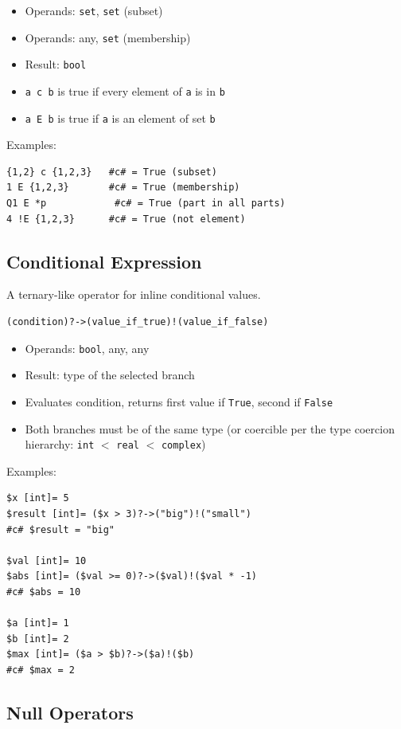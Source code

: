\begin{itemize}
\item Operands: \texttt{set}, \texttt{set} (subset)
\item Operands: any, \texttt{set} (membership)
\item Result: \texttt{bool}
\item \texttt{a c b} is true if every element of \texttt{a} is in \texttt{b}
\item \texttt{a E b} is true if \texttt{a} is an element of set \texttt{b}
\end{itemize}

Examples:
\begin{verbatim}
{1,2} c {1,2,3}   #c# = True (subset)
1 E {1,2,3}       #c# = True (membership)
Q1 E *p            #c# = True (part in all parts)
4 !E {1,2,3}      #c# = True (not element)
\end{verbatim}

\subsection{Conditional Expression}
A ternary-like operator for inline conditional values.
\begin{verbatim}
(condition)?->(value_if_true)!(value_if_false)
\end{verbatim}

\begin{itemize}
\item Operands: \texttt{bool}, any, any
\item Result: type of the selected branch
\item Evaluates condition, returns first value if \texttt{True}, second if \texttt{False}
\item Both branches must be of the same type (or coercible per the type coercion hierarchy: \texttt{int} $<$ \texttt{real} $<$ \texttt{complex})
\end{itemize}

Examples:
\begin{verbatim}
$x [int]= 5
$result [int]= ($x > 3)?->("big")!("small")
#c# $result = "big"

$val [int]= 10
$abs [int]= ($val >= 0)?->($val)!($val * -1)
#c# $abs = 10

$a [int]= 1
$b [int]= 2
$max [int]= ($a > $b)?->($a)!($b)
#c# $max = 2
\end{verbatim}

\subsection{Null Operators}
